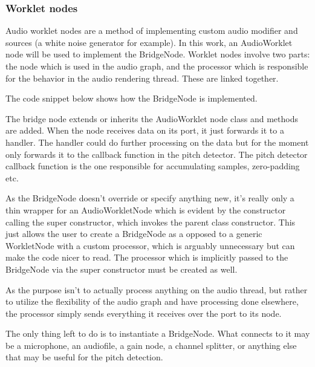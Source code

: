 \subsubsection{Worklet nodes}
Audio worklet nodes are a method of implementing custom audio modifier and sources (a white noise generator for example). In this work, an AudioWorklet node will be used to implement the BridgeNode. Worklet nodes involve two parts: the node which is used in the audio graph, and the processor which is responsible for the behavior in the audio rendering thread. These are linked together.

The code snippet below shows how the BridgeNode is implemented.

The bridge node extends or inherits the AudioWorklet node class and methods are added. When the node receives data on its port, it just forwards it to a handler. The handler could do further processing on the data but for the moment only forwards it to the callback function in the pitch detector. The pitch detector callback function is the one responsible for accumulating samples, zero-padding etc.

As the BridgeNode doesn't override or specify anything new, it's really only a thin wrapper for an AudioWorkletNode which is evident by the constructor calling the super constructor, which invokes the parent class constructor. This just allows the user to create a BridgeNode as a opposed to a generic WorkletNode with a custom processor, which is arguably unnecessary but can make the code nicer to read. The processor which is implicitly passed to the BridgeNode via the super constructor must be created as well.

As the purpose isn't to actually process anything on the audio thread, but rather to utilize the flexibility of the audio graph and have processing done elsewhere, the processor simply sends everything it receives over the port to its node. 

The only thing left to do is to instantiate a BridgeNode. What connects to it may be a microphone, an audiofile, a gain node, a channel splitter, or anything else that may be useful for the pitch detection.


